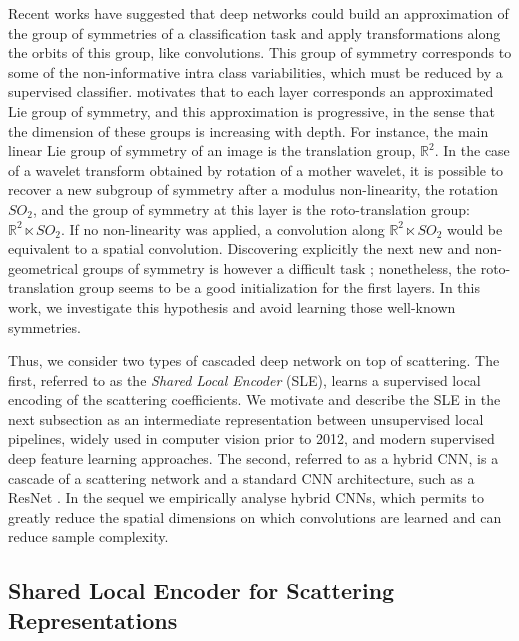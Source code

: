 \documentclass[10pt,twocolumn,letterpaper]{article}
\newcommand{\citep}{\cite}
\begin{document}
 Recent works \citep{mallat2016understanding,bruna2013learning,jacobsen2017multiscale} have suggested that  deep networks could  build an approximation of the group of symmetries of a classification task and apply transformations along the orbits of this group, like convolutions. This group of symmetry corresponds to some of the non-informative intra class variabilities, which must be reduced by a supervised classifier. \citep{mallat2016understanding} motivates that to each layer corresponds an approximated Lie group of symmetry, and this approximation is progressive, in the sense that the dimension of these groups is increasing with depth. For instance, the main linear Lie group of symmetry of an image is the translation group, $\mathbb{R}^2$. In the case of a wavelet transform obtained by rotation of a mother wavelet, it is possible to recover a new subgroup of symmetry after a modulus non-linearity, the rotation $SO_2$, and the group of symmetry at this layer is the roto-translation group: $\mathbb{R}^2 \ltimes SO_2$. If no non-linearity was applied, a convolution along $\mathbb{R}^2 \ltimes SO_2$ would be equivalent to a spatial convolution. Discovering explicitly the next new and non-geometrical groups of symmetry is however a difficult task \cite{jacobsen2017multiscale}; nonetheless, the roto-translation group seems to be a good initialization for the first layers. In this work, we investigate this hypothesis and avoid learning those well-known symmetries.




Thus, we consider two types of cascaded deep network on top of scattering. The first, referred to as the \textit{Shared Local Encoder} (SLE), learns a supervised local encoding of the scattering coefficients. We motivate and describe the SLE in the next subsection as an intermediate representation between unsupervised local pipelines, widely used in computer vision prior to 2012, and modern supervised deep feature learning approaches. 
The second, referred to as a hybrid CNN, is a cascade of a scattering network and a standard CNN architecture, such as a ResNet \cite{he2015deep}. In the sequel we empirically analyse hybrid CNNs, which permits to greatly reduce the spatial dimensions on which convolutions are learned and can reduce sample complexity.   
  



 
\subsection{Shared Local Encoder for Scattering Representations}
\label{supervised_encoding}
\end{document}
